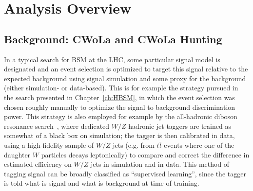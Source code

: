 \section{Analysis Overview}
\label{sec:CWoLa:analysis}

\subsection{Background: CWoLa and CWoLa Hunting}
\label{sec:CWoLa:schematic}
In a typical search for BSM at the LHC, some particular signal model is designated and an event selection is optimized to target this signal relative to the expected background using signal simulation and some proxy for the background (either simulation- or data-based).
This is for example the strategy pursued in the search presented in Chapter~\ref{ch:HBSM}, in which the event selection was chosen roughly manually to optimize the signal to background discrimination power.
This strategy is also employed for example by the all-hadronic diboson resonance search~\cite{Aad:2019fbh}, where dedicated $W/Z$ hadronic jet taggers are trained as somewhat of a black box on simulation; the tagger is then calibrated in data, using a high-fidelity sample of $W/Z$ jets (e.g. from $t\bar{t}$ events where one of the daughter $W$ particles decays leptonically) to compare and correct the difference in estimated efficiency on $W/Z$ jets in simulation and in data.
This method of tagging signal can be broadly classified as ``supervised learning'', since the tagger is told what is signal and what is background at time of training.

